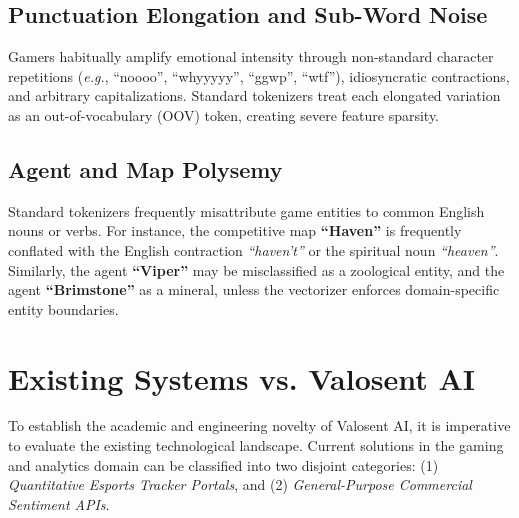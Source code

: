 \subsection{Punctuation Elongation and Sub-Word Noise}
Gamers habitually amplify emotional intensity through non-standard character repetitions (\textit{e.g.}, ``noooo'', ``whyyyyy'', ``ggwp'', ``wtf''), idiosyncratic contractions, and arbitrary capitalizations. Standard tokenizers treat each elongated variation as an out-of-vocabulary (OOV) token, creating severe feature sparsity.

\subsection{Agent and Map Polysemy}
Standard tokenizers frequently misattribute game entities to common English nouns or verbs. For instance, the competitive map \textbf{``Haven''} is frequently conflated with the English contraction \textit{``haven't''} or the spiritual noun \textit{``heaven''}. Similarly, the agent \textbf{``Viper''} may be misclassified as a zoological entity, and the agent \textbf{``Brimstone''} as a mineral, unless the vectorizer enforces domain-specific entity boundaries.

\section{Existing Systems vs. Valosent AI}
\label{sec:existing_vs_valosent}

To establish the academic and engineering novelty of Valosent AI, it is imperative to evaluate the existing technological landscape. Current solutions in the gaming and analytics domain can be classified into two disjoint categories: (1) \textit{Quantitative Esports Tracker Portals}, and (2) \textit{General-Purpose Commercial Sentiment APIs}.

